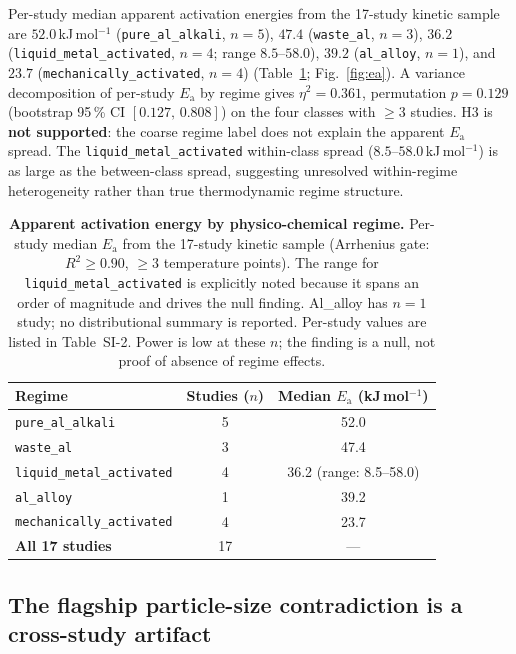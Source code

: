 Per-study median apparent activation energies from the 17-study kinetic sample are
$52.0$\,kJ\,mol$^{-1}$ (\texttt{pure\_al\_alkali}, $n\!=\!5$), $47.4$
(\texttt{waste\_al}, $n\!=\!3$), $36.2$ (\texttt{liquid\_metal\_activated}, $n\!=\!4$;
range $8.5$--$58.0$), $39.2$ (\texttt{al\_alloy}, $n\!=\!1$), and $23.7$
(\texttt{mechanically\_activated}, $n\!=\!4$) (Table~\ref{tab:ea_summary};
Fig.~\ref{fig:ea}). A variance decomposition of per-study $E_\mathrm{a}$ by regime
gives $\eta^2\!=\!0.361$, permutation $p\!=\!0.129$ (bootstrap 95\,\% CI $[0.127,\,0.808]$)
on the four classes with $\ge\!3$ studies. H3 is \textbf{not supported}: the
coarse regime label does not explain the apparent $E_\mathrm{a}$ spread. The
\texttt{liquid\_metal\_activated} within-class spread ($8.5$--$58.0$\,kJ\,mol$^{-1}$)
is as large as the between-class spread, suggesting unresolved within-regime
heterogeneity rather than true thermodynamic regime structure.

\begin{table}[tbp]
\centering
\caption{\textbf{Apparent activation energy by physico-chemical regime.}
Per-study median $E_\mathrm{a}$ from the 17-study kinetic sample (Arrhenius gate:
$R^2\!\ge\!0.90$, $\ge\!3$ temperature points). The range for
\texttt{liquid\_metal\_activated} is explicitly noted because it spans an order of
magnitude and drives the null finding. Al\_alloy has $n\!=\!1$ study; no
distributional summary is reported. Per-study values are listed in Table~SI-2.
Power is low at these $n$; the finding is a null, not proof of absence of regime effects.}
\label{tab:ea_summary}
\begin{tabular}{lcc}
\hline
Regime & Studies ($n$) & Median $E_\mathrm{a}$ (kJ\,mol$^{-1}$) \\
\hline
\texttt{pure\_al\_alkali}         & 5 & 52.0 \\
\texttt{waste\_al}                & 3 & 47.4 \\
\texttt{liquid\_metal\_activated} & 4 & 36.2 \quad (range: 8.5--58.0) \\
\texttt{al\_alloy}                & 1 & 39.2 \\
\texttt{mechanically\_activated}  & 4 & 23.7 \\
\hline
\textbf{All 17 studies}           & 17 & --- \\
\hline
\end{tabular}
\end{table}

\subsection{The flagship particle-size contradiction is a cross-study artifact}

